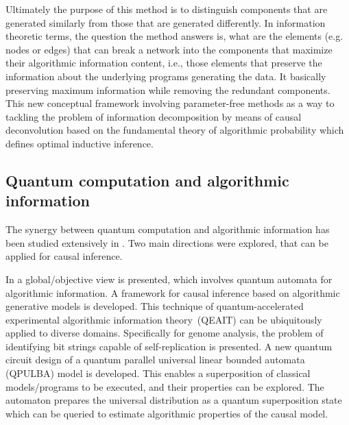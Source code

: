 Ultimately the purpose of this method is to distinguish components that are generated similarly from those that are generated differently. 
In information theoretic terms, the question the method answers is, what are the elements (e.g. nodes or edges) that can break a network into the components that maximize their algorithmic information content, i.e., those elements that preserve the information about the underlying programs generating the data.
It basically preserving maximum information while removing the redundant components. 
This new conceptual framework involving parameter-free methods as a way to tackling the problem of information decomposition by means of causal deconvolution based on the fundamental theory of algorithmic probability which defines optimal inductive inference.

\subsection{Quantum computation and algorithmic information}

The synergy between quantum computation and algorithmic information has been studied extensively in \cite{sarkar2022applications}.
Two main directions were explored, that can be applied for causal inference.

In \cite{sarkar2021estimating} a global/objective view is presented, which involves quantum automata for algorithmic information.
A framework for causal inference based on algorithmic generative models is developed. 
This technique of quantum-accelerated experimental algorithmic information theory~(QEAIT) can be ubiquitously applied to diverse domains. 
Specifically for genome analysis, the problem of identifying bit strings capable of self-replication is presented. 
A new quantum circuit design of a quantum parallel universal linear bounded automata (QPULBA) model is developed.
This enables a superposition of classical models/programs to be executed, and their properties can be explored. 
The automaton prepares the universal distribution as a quantum superposition state which can be queried to estimate algorithmic properties of the causal model.

